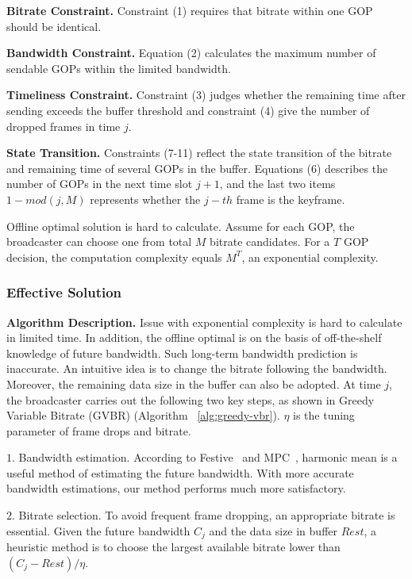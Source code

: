 \textbf{Bitrate Constraint.} Constraint (1) requires that bitrate within one GOP should be identical.

\textbf{Bandwidth Constraint.} Equation (2) calculates the maximum number of sendable GOPs within the limited bandwidth.

\textbf{Timeliness Constraint.} Constraint (3) judges whether the remaining time after sending exceeds the buffer threshold and constraint (4) give the number of dropped frames in time $j$.

\textbf{State Transition.} Constraints (7-11) reflect the state transition of the bitrate and remaining time of several GOPs in the buffer. Equations (6) describes the number of GOPs in the next time slot $j+1$, and the last two items $1-mod(j,M)$ represents whether the $j-th$ frame is the keyframe.

Offline optimal solution is hard to calculate. Assume for each GOP, the broadcaster can choose one from total $M$ bitrate candidates. For a $T$ GOP decision, the computation complexity equals $M^T$, an exponential complexity.

\subsubsection{Effective Solution}

\textbf{Algorithm Description.} Issue with exponential complexity is hard to calculate in limited time. In addition, the offline optimal is on the basis of off-the-shelf knowledge of future bandwidth. Such long-term bandwidth prediction is inaccurate. An intuitive idea is to change the bitrate following the bandwidth. Moreover, the remaining data size in the buffer can also be adopted. At time $j$, the broadcaster carries out the following two key steps, as shown in Greedy Variable Bitrate (GVBR) (Algorithm ~\ref{alg:greedy-vbr}). $\eta$ is the tuning parameter of frame drops and bitrate.

$1.$ Bandwidth estimation. According to Festive~\cite{jiang2014improving} and MPC~\cite{yin2015control}, harmonic mean is a useful method of estimating the future bandwidth. With more accurate bandwidth estimations, our method performs much more satisfactory.

$2.$ Bitrate selection. To avoid frequent frame dropping, an appropriate bitrate is essential. Given the future bandwidth $C_j$ and the data size in buffer $Rest$, a heuristic method is to choose the largest available bitrate lower than $(C_j-Rest)/\eta$.
